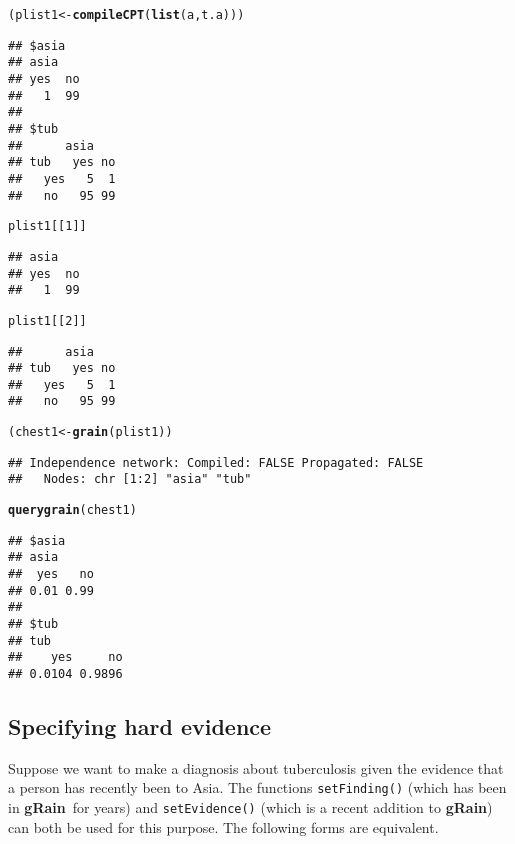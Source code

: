 \documentclass[10pt]{article}\usepackage[]{graphicx}\usepackage[]{color}
\makeatletter
\newcommand{\hlnum}[1]{\textcolor[rgb]{0.686,0.059,0.569}{#1}}%
\newcommand{\hlstd}[1]{\textcolor[rgb]{0.345,0.345,0.345}{#1}}%
\newcommand{\hlkwb}[1]{\textcolor[rgb]{0.69,0.353,0.396}{#1}}%
\newcommand{\hlkwd}[1]{\textcolor[rgb]{0.737,0.353,0.396}{\textbf{#1}}}%
\newenvironment{kframe}{%
 \def\at@end@of@kframe{}%
 \ifinner\ifhmode%
  \def\at@end@of@kframe{\end{minipage}}%
  \begin{minipage}{\columnwidth}%
 \fi\fi%
 \def\FrameCommand##1{\hskip\@totalleftmargin \hskip-\fboxsep
 \colorbox{shadecolor}{##1}\hskip-\fboxsep
     \hskip-\linewidth \hskip-\@totalleftmargin \hskip\columnwidth}%
 \MakeFramed {\advance\hsize-\width
   \@totalleftmargin\z@ \linewidth\hsize
   \@setminipage}}%
 {\par\unskip\endMakeFramed%
 \at@end@of@kframe}
\newenvironment{knitrout}{}{} %
\def\grbn{{\bf gRain}}
\def\code#1{{\texttt{#1}}}
\makeatother
\begin{document}
\begin{knitrout}
\begin{kframe}
\begin{alltt}
\hlstd{(plist1} \hlkwb{<-} \hlkwd{compileCPT}\hlstd{(}\hlkwd{list}\hlstd{(a, t.a)))}
\end{alltt}
\begin{verbatim}
## $asia
## asia
## yes  no 
##   1  99 
## 
## $tub
##      asia
## tub   yes no
##   yes   5  1
##   no   95 99
\end{verbatim}
\begin{alltt}
\hlstd{plist1[[}\hlnum{1}\hlstd{]]}
\end{alltt}
\begin{verbatim}
## asia
## yes  no 
##   1  99
\end{verbatim}
\begin{alltt}
\hlstd{plist1[[}\hlnum{2}\hlstd{]]}
\end{alltt}
\begin{verbatim}
##      asia
## tub   yes no
##   yes   5  1
##   no   95 99
\end{verbatim}
\begin{alltt}
\hlstd{(chest1} \hlkwb{<-} \hlkwd{grain}\hlstd{(plist1))}
\end{alltt}
\begin{verbatim}
## Independence network: Compiled: FALSE Propagated: FALSE 
##   Nodes: chr [1:2] "asia" "tub"
\end{verbatim}
\begin{alltt}
\hlkwd{querygrain}\hlstd{(chest1)}
\end{alltt}
\begin{verbatim}
## $asia
## asia
##  yes   no 
## 0.01 0.99 
## 
## $tub
## tub
##    yes     no 
## 0.0104 0.9896
\end{verbatim}
\end{kframe}
\end{knitrout}

\subsection{Specifying hard evidence}
\label{sec:hard-evidence}

Suppose we want to make a diagnosis about tuberculosis given the
evidence that a person has recently been to Asia. The functions
\code{setFinding()} (which has been in \grbn\ for years) and
\code{setEvidence()} (which is a recent addition to \grbn) can both be used for this
purpose. The following forms are equivalent.
\end{document}
